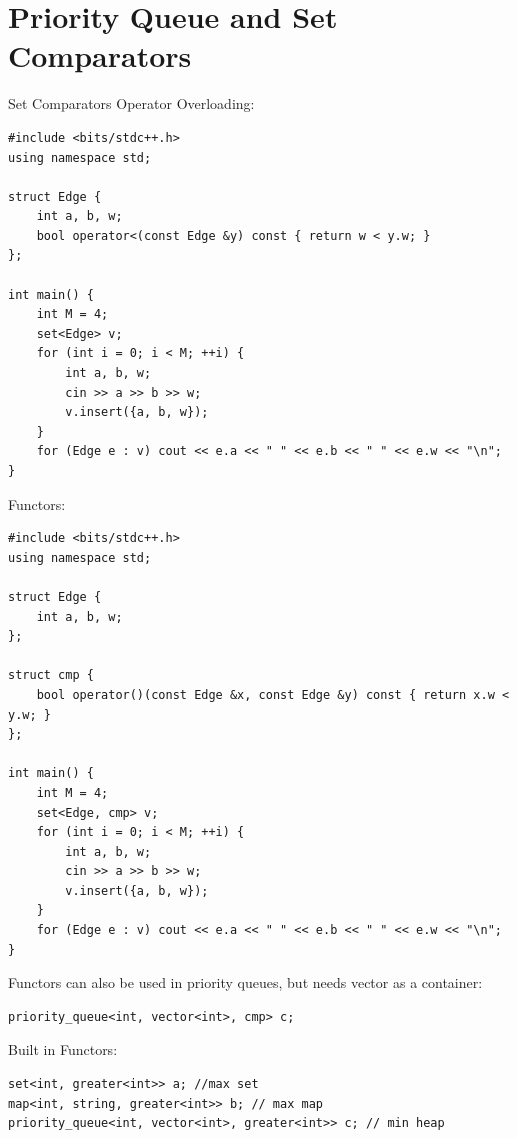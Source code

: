 \section{Priority Queue and Set Comparators}

Set Comparators
Operator Overloading:
\begin{lstlisting}
#include <bits/stdc++.h>
using namespace std;

struct Edge {
	int a, b, w;
	bool operator<(const Edge &y) const { return w < y.w; }
};

int main() {
	int M = 4;
	set<Edge> v;
	for (int i = 0; i < M; ++i) {
		int a, b, w;
		cin >> a >> b >> w;
		v.insert({a, b, w});
	}
	for (Edge e : v) cout << e.a << " " << e.b << " " << e.w << "\n";
}
\end{lstlisting}
Functors:

\begin{lstlisting}
#include <bits/stdc++.h>
using namespace std;

struct Edge {
	int a, b, w;
};

struct cmp {
	bool operator()(const Edge &x, const Edge &y) const { return x.w < y.w; }
};

int main() {
	int M = 4;
	set<Edge, cmp> v;
	for (int i = 0; i < M; ++i) {
		int a, b, w;
		cin >> a >> b >> w;
		v.insert({a, b, w});
	}
	for (Edge e : v) cout << e.a << " " << e.b << " " << e.w << "\n";
}
\end{lstlisting}

Functors can also be used in priority queues, but needs vector as a container:

\begin{lstlisting}
priority_queue<int, vector<int>, cmp> c; 
\end{lstlisting}
Built in Functors:
\begin{lstlisting}
set<int, greater<int>> a; //max set
map<int, string, greater<int>> b; // max map
priority_queue<int, vector<int>, greater<int>> c; // min heap
\end{lstlisting}
